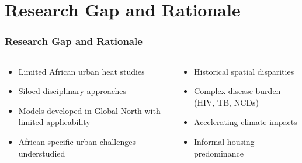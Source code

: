 \documentclass[aspectratio=169]{beamer}
\begin{document}
\section{Research Gap and Rationale}

\begin{frame}
    \frametitle{Research Gap and Rationale}
    
    \begin{columns}[T]
        \begin{column}{0.48\textwidth}
            \begin{tcolorbox}[colback=witsteal!10, colframe=witsteal, title=Current Research Limitations]
                \begin{itemize}[leftmargin=*, itemsep=6pt]
                    \item Limited African urban heat studies
                    \item Siloed disciplinary approaches
                    \item Models developed in Global North with limited applicability
                    \item African-specific urban challenges understudied
                \end{itemize}
            \end{tcolorbox}
        \end{column}
        
        \begin{column}{0.48\textwidth}
            \begin{tcolorbox}[colback=witsteal!10, colframe=witsteal, title=Johannesburg's Unique Challenges]
                \begin{itemize}[leftmargin=*, itemsep=6pt]
                    \item Historical spatial disparities
                    \item Complex disease burden (HIV, TB, NCDs)
                    \item Accelerating climate impacts
                    \item Informal housing predominance
                \end{itemize}
            \end{tcolorbox}
        \end{column}
    \end{columns}
    
    \vspace{0.5cm}
    \begin{center}
    \end{center}
\end{frame}
\end{document}
